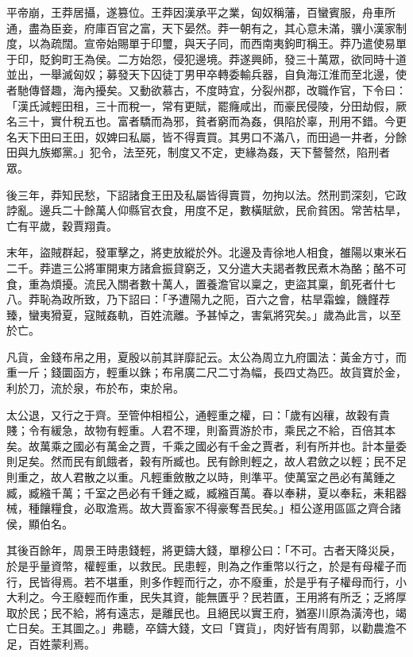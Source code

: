 \begin{pinyinscope}
平帝崩，王莽居攝，遂篡位。王莽因漢承平之業，匈奴稱藩，百蠻賓服，舟車所通，盡為臣妾，府庫百官之富，天下晏然。莽一朝有之，其心意未滿，骥小漢家制度，以為疏闊。宣帝始賜單于印璽，與天子同，而西南夷鉤町稱王。莽乃遣使易單于印，貶鉤町王為侯。二方始怨，侵犯邊境。莽遂興師，發三十萬眾，欲同時十道並出，一舉滅匈奴；募發天下囚徒丁男甲卒轉委輸兵器，自負海江淮而至北邊，使者馳傳督趣，海內擾矣。又動欲慕古，不度時宜，分裂州郡，改職作官，下令曰：「漢氏減輕田租，三十而稅一，常有更賦，罷癃咸出，而豪民侵陵，分田劫假，厥名三十，實什稅五也。富者驕而為邪，貧者窮而為姦，俱陷於辜，刑用不錯。今更名天下田曰王田，奴婢曰私屬，皆不得賣買。其男口不滿八，而田過一井者，分餘田與九族鄉黨。」犯令，法至死，制度又不定，吏緣為姦，天下謷謷然，陷刑者眾。

後三年，莽知民愁，下詔諸食王田及私屬皆得賣買，勿拘以法。然刑罰深刻，它政誖亂。邊兵二十餘萬人仰縣官衣食，用度不足，數橫賦歛，民俞貧困。常苦枯旱，亡有平歲，穀賈翔貴。

末年，盜賊群起，發軍擊之，將吏放縱於外。北邊及青徐地人相食，雒陽以東米石二千。莽遣三公將軍開東方諸倉振貸窮乏，又分遣大夫謁者教民煮木為酪；酪不可食，重為煩擾。流民入關者數十萬人，置養澹官以稟之，吏盜其稟，飢死者什七八。莽恥為政所致，乃下詔曰：「予遭陽九之阨，百六之會，枯旱霜蝗，饑饉荐臻，蠻夷猾夏，寇賊姦軌，百姓流離。予甚悼之，害氣將究矣。」歲為此言，以至於亡。

凡貨，金錢布帛之用，夏殷以前其詳靡記云。太公為周立九府圜法：黃金方寸，而重一斤；錢圜函方，輕重以銖；布帛廣二尺二寸為幅，長四丈為匹。故貨寶於金，利於刀，流於泉，布於布，束於帛。

太公退，又行之于齊。至管仲相桓公，通輕重之權，曰：「歲有凶穰，故穀有貴賤；令有緩急，故物有輕重。人君不理，則畜賈游於市，乘民之不給，百倍其本矣。故萬乘之國必有萬金之賈，千乘之國必有千金之賈者，利有所并也。計本量委則足矣。然而民有飢餓者，穀有所臧也。民有餘則輕之，故人君斂之以輕；民不足則重之，故人君散之以重。凡輕重斂散之以時，則準平。使萬室之邑必有萬鍾之臧，臧繈千萬；千室之邑必有千鍾之臧，臧繈百萬。春以奉耕，夏以奉耘，耒耜器械，種饟糧食，必取澹焉。故大賈畜家不得豪奪吾民矣。」桓公遂用區區之齊合諸侯，顯伯名。

其後百餘年，周景王時患錢輕，將更鑄大錢，單穆公曰：「不可。古者天降災戾，於是乎量資幣，權輕重，以救民。民患輕，則為之作重幣以行之，於是有母權子而行，民皆得焉。若不堪重，則多作輕而行之，亦不廢重，於是乎有子權母而行，小大利之。今王廢輕而作重，民失其資，能無匱乎？民若匱，王用將有所乏；乏將厚取於民；民不給，將有遠志，是離民也。且絕民以實王府，猶塞川原為潢洿也，竭亡日矣。王其圖之。」弗聽，卒鑄大錢，文曰「寶貨」，肉好皆有周郭，以勸農澹不足，百姓蒙利焉。


\end{pinyinscope}
